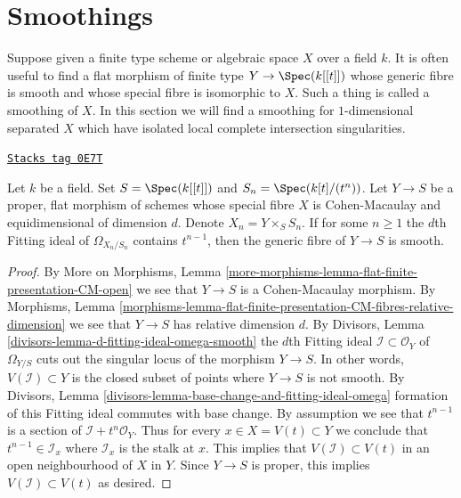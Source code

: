 \section{Smoothings}
\label{examples-defos-section-smoothing}
Suppose given a finite type scheme or algebraic space $X$ over a field $k$.
It is often useful to find a flat morphism of finite type $Y \to \Spec(k[[t]])$
whose generic fibre is smooth and whose special fibre is isomorphic to $X$.
Such a thing is called a smoothing of $X$. In this section we will find
a smoothing for $1$-dimensional separated $X$ which have isolated
local complete intersection singularities.

\begin{lemma}
\label{examples-defos-lemma-criterion-smoothing}
\href{https://stacks.math.columbia.edu/tag/0E7T}{\texttt{Stacks tag 0E7T}}

Let $k$ be a field. Set $S = \Spec(k[[t]])$ and
$S_n = \Spec(k[t]/(t^n))$. Let $Y \to S$ be a proper, flat morphism
of schemes whose special fibre $X$ is Cohen-Macaulay and
equidimensional of dimension $d$. Denote $X_n = Y \times_S S_n$.
If for some $n \geq 1$ the $d$th Fitting ideal of $\Omega_{X_n/S_n}$
contains $t^{n - 1}$, then the generic fibre of $Y \to S$ is smooth.
\end{lemma}

\begin{proof}
By More on Morphisms, Lemma
\ref{more-morphisms-lemma-flat-finite-presentation-CM-open}
we see that $Y \to S$ is a Cohen-Macaulay morphism.
By Morphisms, Lemma
\ref{morphisms-lemma-flat-finite-presentation-CM-fibres-relative-dimension}
we see that $Y \to S$ has relative dimension $d$.
By Divisors, Lemma \ref{divisors-lemma-d-fitting-ideal-omega-smooth}
the $d$th Fitting ideal $\mathcal{I} \subset \mathcal{O}_Y$
of $\Omega_{Y/S}$ cuts out the singular locus of the morphism $Y \to S$.
In other words, $V(\mathcal{I}) \subset Y$ is the closed subset
of points where $Y \to S$ is not smooth.
By Divisors, Lemma \ref{divisors-lemma-base-change-and-fitting-ideal-omega}
formation of this Fitting ideal commutes with base change.
By assumption we see that $t^{n - 1}$ is a section of
$\mathcal{I} + t^n\mathcal{O}_Y$. Thus for every
$x \in X = V(t) \subset Y$ we conclude that
$t^{n - 1} \in \mathcal{I}_x$ where $\mathcal{I}_x$ is the stalk at $x$.
This implies that $V(\mathcal{I}) \subset V(t)$ in an
open neighbourhood of $X$ in $Y$. Since $Y \to S$
is proper, this implies $V(\mathcal{I}) \subset V(t)$
as desired.
\end{proof}


